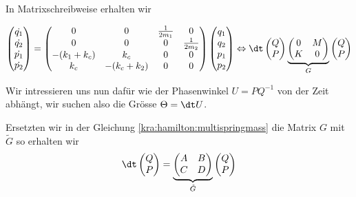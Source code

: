 In Matrixschreibweise erhalten wir

\begin{equation}
    \label{kra:hamilton:multispringmass}
    \begin{pmatrix}
        \dot{q_1} \\
        \dot{q_2} \\
        \dot{p_1} \\
        \dot{p_2} \\
    \end{pmatrix}
    =
    \begin{pmatrix}
        0            & 0            & \frac{1}{2m_1} & 0              \\
        0            & 0            & 0              & \frac{1}{2m_2} \\
        -(k_1 + k_c) & k_c          & 0              & 0              \\
        k_c          & -(k_c + k_2) & 0              & 0              \\
    \end{pmatrix}
    \begin{pmatrix}
        q_1 \\
        q_2 \\
        p_1 \\
        p_2 \\
    \end{pmatrix}
    \Leftrightarrow
    \dt
    \begin{pmatrix}
        Q \\
        P \\
    \end{pmatrix}
    \underbrace{
        \begin{pmatrix}
            0 & M \\
            K & 0
        \end{pmatrix}
    }_{G}
    \begin{pmatrix}
        Q \\
        P \\
    \end{pmatrix}
\end{equation}


Wir intressieren uns nun dafür wie der Phasenwinkel $U = PQ^{-1}$ von der Zeit abhängt,
wir suchen also die Grösse $\Theta = \dt U$.

Ersetzten wir in der Gleichung \ref{kra:hamilton:multispringmass} die Matrix $G$ mit $\tilde{G}$ so erhalten wir
\begin{equation}
    \dt
    \begin{pmatrix}
        Q \\
        P
    \end{pmatrix}
    =
    \underbrace{
        \begin{pmatrix}
            A & B \\
            C & D
        \end{pmatrix}
    }_{\tilde{G}}
    \begin{pmatrix}
        Q \\
        P
    \end{pmatrix}
\end{equation}

